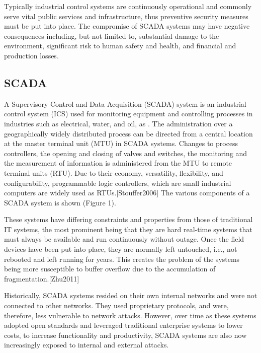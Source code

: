 \documentclass[12pt,]{article}
\begin{document}
Typically industrial control systems are continuously operational and
commonly serve vital public services and infrastructure, thus preventive
security measures must be put into place. The compromise of SCADA
systems may have negative consequences including, but not limited to,
substantial damage to the environment, significant risk to human safety
and health, and financial and production losses.

\subsection{SCADA}\label{scada}

A Supervisory Control and Data Acquisition (SCADA) system is an
industrial control system (ICS) used for monitoring equipment and
controlling processes in industries such as electrical, water, and oil,
as . The administration over a geographically widely distributed process
can be directed from a central location at the master terminal unit
(MTU) in SCADA systems. Changes to process controllers, the opening and
closing of valves and switches, the monitoring and the measurement of
information is administered from the MTU to remote terminal units (RTU).
Due to their economy, versatility, flexibility, and configurability,
programmable logic controllers, which are small industrial computers are
widely used as RTUs.{[}Stouffer2006{]} The various components of a SCADA
system is shown (Figure 1).

These systems have differing constraints and properties from those of
traditional IT systems, the most prominent being that they are hard
real-time systems that must always be available and run continuously
without outage. Once the field devices have been put into place, they
are normally left untouched, i.e., not rebooted and left running for
years. This creates the problem of the systems being more susceptible to
buffer overflow due to the accumulation of fragmentation.{[}Zhu2011{]}

Historically, SCADA systems resided on their own internal networks and
were not connected to other networks. They used proprietary protocols,
and were, therefore, less vulnerable to network attacks. However, over
time as these systems adopted open standards and leveraged traditional
enterprise systems to lower costs, to increase functionality and
productivity, SCADA systems are also now increasingly exposed to
internal and external attacks.
\end{document}
